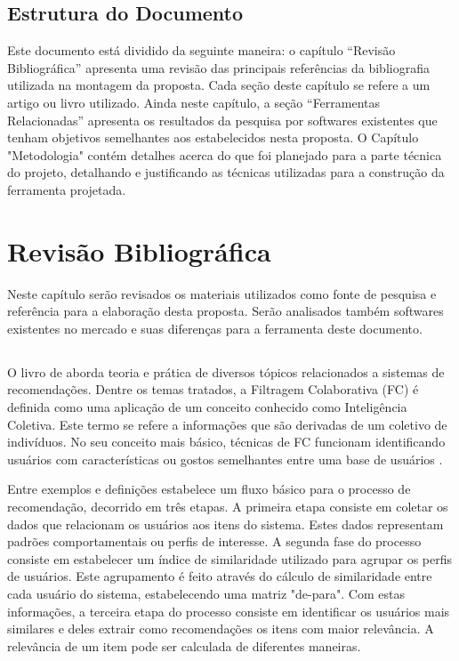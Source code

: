 \documentclass[
	12pt,				%
    oneside,			%
	a4paper,			%
	english,			%
	french,				%
	spanish,			%
	brazil,				%
	]{abntex2}
\begin{document}
\section{Estrutura do Documento}
Este documento está dividido da seguinte maneira: o capítulo ``Revisão Bibliográfica'' apresenta uma revisão das principais referências da bibliografia utilizada na montagem da proposta.
Cada seção deste capítulo se refere a um artigo ou livro utilizado. Ainda neste capítulo, a seção ``Ferramentas Relacionadas'' apresenta os resultados da pesquisa por softwares existentes 
que tenham objetivos semelhantes aos estabelecidos nesta proposta. O Capítulo "Metodologia" contém detalhes acerca do que foi planejado para a parte técnica do projeto, detalhando e 
justificando as técnicas utilizadas para a construção da ferramenta projetada.

\chapter{Revisão Bibliográfica}
Neste capítulo serão revisados os materiais utilizados como fonte de pesquisa e referência para a elaboração desta proposta. Serão analisados também softwares 
existentes no mercado e suas diferenças para a ferramenta deste documento.

\section{}
O livro de  aborda teoria e prática de diversos tópicos relacionados a sistemas de recomendações. Dentre os temas tratados, 
a Filtragem Colaborativa (FC) é definida como uma aplicação de um conceito conhecido como Inteligência Coletiva. Este termo se refere a informações que são derivadas
de um coletivo de indivíduos. No seu conceito mais básico, técnicas de FC funcionam identificando usuários com características ou gostos semelhantes entre uma base
de usuários \cite{1-Oreilly}.

Entre exemplos e definições  estabelece um fluxo básico para o processo de recomendação, decorrido em três etapas. A primeira etapa 
consiste em coletar os dados que relacionam os usuários aos itens do sistema. Estes dados representam padrões comportamentais ou perfis de interesse. A segunda
fase do processo consiste em estabelecer um índice de similaridade utilizado para agrupar os perfis de usuários. Este agrupamento é feito através do cálculo de 
similaridade entre cada usuário do sistema, estabelecendo uma matriz "de-para". Com estas informações, a terceira etapa do processo consiste em identificar os
usuários mais similares e deles extrair como recomendações os itens com maior relevância. A relevância de um item pode ser calculada de diferentes maneiras.
\end{document}
